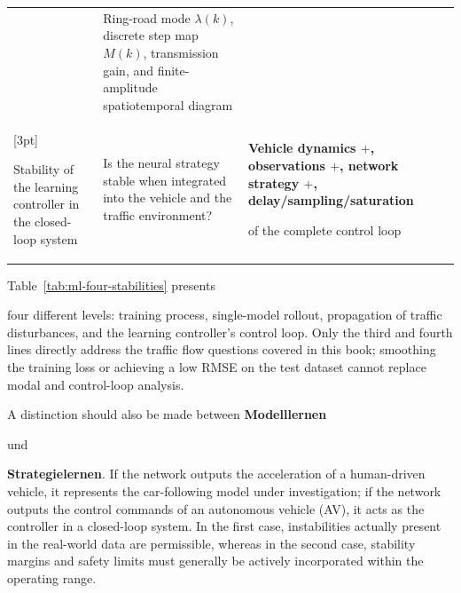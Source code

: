 \documentclass[11pt,a4paper,openany]{book}
\numberwithin{equation}{chapter}
\numberwithin{figure}{chapter}
\numberwithin{table}{chapter}
\newcommand{\tabletext}[2]{%
  \par\smallskip\noindent
  Table~\ref{#1} presents #2
\par\smallskip
}
\begin{document}
\begin{center}
\begin{tabular}{p{3.2cm}p{4.2cm}p{6.8cm}}
&

Ring-road mode $\lambda(k)$, discrete step map $M(k)$, transmission gain, and finite-amplitude spatiotemporal diagram





\\

[3pt]

Stability of the learning controller in the closed-loop system






&






Is the neural strategy stable when integrated into the vehicle and the traffic environment?






& \textbf{Vehicle dynamics $+$, observations $+$, network strategy $+$, delay/sampling/saturation}






of the complete control loop





\\
\bottomrule
\end{tabular}
\end{center}
\tabletext{tab:ml-four-stabilities}{






four different levels: training process, single-model rollout, propagation of traffic disturbances, and the learning controller's control loop. Only the third and fourth lines directly address the traffic flow questions covered in this book; smoothing the training loss or achieving a low RMSE on the test dataset cannot replace modal and control-loop analysis.


}












A distinction should also be made between
\textbf{Modelllernen}




und




\textbf{Strategielernen}. If the network outputs the acceleration of a human-driven vehicle, it represents the car-following model under investigation; if the network outputs the control commands of an autonomous vehicle (AV), it acts as the controller in a closed-loop system. In the first case, instabilities actually present in the real-world data are permissible, whereas in the second case, stability margins and safety limits must generally be actively incorporated within the operating range.
\end{document}
